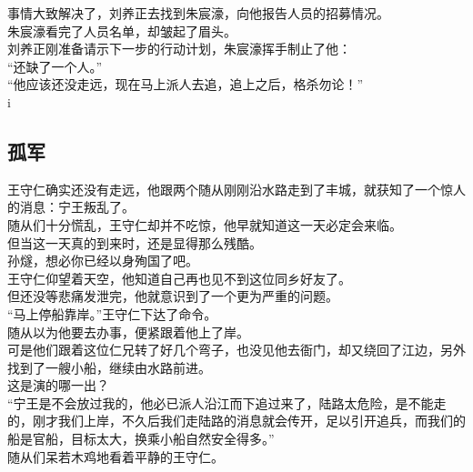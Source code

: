 \begin{multicols}{\theparacolNo}
事情大致解决了，刘养正去找到朱宸濠，向他报告人员的招募情况。\\

朱宸濠看完了人员名单，却皱起了眉头。\\

刘养正刚准备请示下一步的行动计划，朱宸濠挥手制止了他：\\

“还缺了一个人。”\\

“他应该还没走远，现在马上派人去追，追上之后，格杀勿论！”\\

i

\subsection{孤军}
王守仁确实还没有走远，他跟两个随从刚刚沿水路走到了丰城，就获知了一个惊人的消息：宁王叛乱了。\\

随从们十分慌乱，王守仁却并不吃惊，他早就知道这一天必定会来临。\\

但当这一天真的到来时，还是显得那么残酷。\\

孙燧，想必你已经以身殉国了吧。\\

王守仁仰望着天空，他知道自己再也见不到这位同乡好友了。\\

但还没等悲痛发泄完，他就意识到了一个更为严重的问题。\\

“马上停船靠岸。”王守仁下达了命令。\\

随从以为他要去办事，便紧跟着他上了岸。\\

可是他们跟着这位仁兄转了好几个弯子，也没见他去衙门，却又绕回了江边，另外找到了一艘小船，继续由水路前进。\\

这是演的哪一出？\\

“宁王是不会放过我的，他必已派人沿江而下追过来了，陆路太危险，是不能走的，刚才我们上岸，不久后我们走陆路的消息就会传开，足以引开追兵，而我们的船是官船，目标太大，换乘小船自然安全得多。”\\

随从们呆若木鸡地看着平静的王守仁。\\


\end{multicols}
